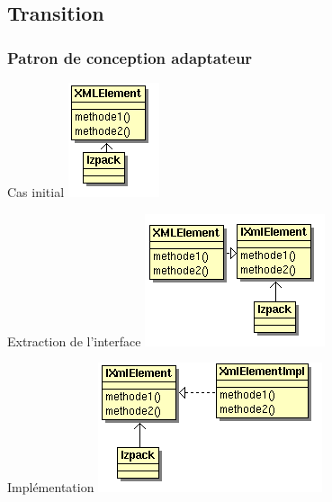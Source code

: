 \subsection{Transition}
\begin{frame}\frametitle{Patron de conception adaptateur}
\begin{minipage}[c]{.46\linewidth}
\begin{beamerboxesrounded}[shadow=true]{Cas initial}
	\centering
	\includegraphics[height=.46\linewidth]{../image/sol_casInitialAlpha.png}
\end{beamerboxesrounded}
\end{minipage}
\hfill
\begin{minipage}[c]{.46\linewidth}
\begin{beamerboxesrounded}[shadow=true]{Extraction de l'interface}
	\centering
	\includegraphics[height=.46\linewidth]{../image/sol_extractionInterfaceAlpha.png}
\end{beamerboxesrounded}
\end{minipage}
\vfill
\hfil
\begin{minipage}[c]{.80\linewidth}
\begin{beamerboxesrounded}[shadow=true]{Implémentation}
	\centering
	\includegraphics[height=.46\linewidth]{../image/sol_implementationAlpha.png}
\end{beamerboxesrounded}
\end{minipage}
\end{frame}
